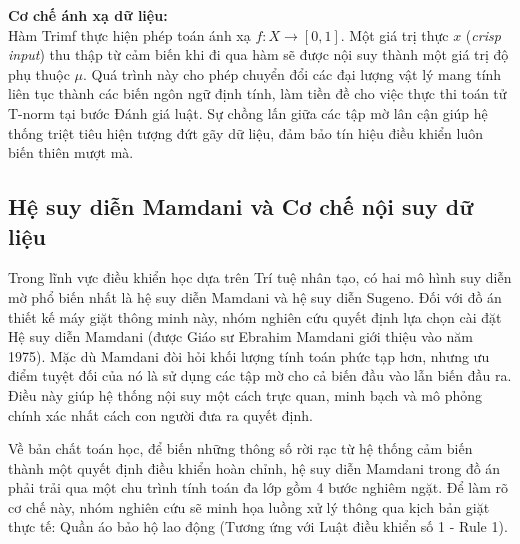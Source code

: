 \documentclass[12pt, a4paper]{article}
\begin{document}
\textbf{Cơ chế ánh xạ dữ liệu:}\\
Hàm Trimf thực hiện phép toán ánh xạ $f: X \rightarrow [0, 1]$. Một giá trị thực $x$ (\textit{crisp input}) thu thập từ cảm biến khi đi qua hàm sẽ được nội suy thành một giá trị độ phụ thuộc $\mu$. Quá trình này cho phép chuyển đổi các đại lượng vật lý mang tính liên tục thành các biến ngôn ngữ định tính, làm tiền đề cho việc thực thi toán tử T-norm tại bước Đánh giá luật. Sự chồng lấn giữa các tập mờ lân cận giúp hệ thống triệt tiêu hiện tượng đứt gãy dữ liệu, đảm bảo tín hiệu điều khiển luôn biến thiên mượt mà.

\subsection{Hệ suy diễn Mamdani và Cơ chế nội suy dữ liệu}
Trong lĩnh vực điều khiển học dựa trên Trí tuệ nhân tạo, có hai mô hình suy diễn mờ phổ biến nhất là hệ suy diễn Mamdani và hệ suy diễn Sugeno. Đối với đồ án thiết kế máy giặt thông minh này, nhóm nghiên cứu quyết định lựa chọn cài đặt Hệ suy diễn Mamdani (được Giáo sư Ebrahim Mamdani giới thiệu vào năm 1975). Mặc dù Mamdani đòi hỏi khối lượng tính toán phức tạp hơn, nhưng ưu điểm tuyệt đối của nó là sử dụng các tập mờ cho cả biến đầu vào lẫn biến đầu ra. Điều này giúp hệ thống nội suy một cách trực quan, minh bạch và mô phỏng chính xác nhất cách con người đưa ra quyết định.

Về bản chất toán học, để biến những thông số rời rạc từ hệ thống cảm biến thành một quyết định điều khiển hoàn chỉnh, hệ suy diễn Mamdani trong đồ án phải trải qua một chu trình tính toán đa lớp gồm 4 bước nghiêm ngặt. Để làm rõ cơ chế này, nhóm nghiên cứu sẽ minh họa luồng xử lý thông qua kịch bản giặt thực tế: Quần áo bảo hộ lao động (Tương ứng với Luật điều khiển số 1 - Rule 1).
\end{document}
